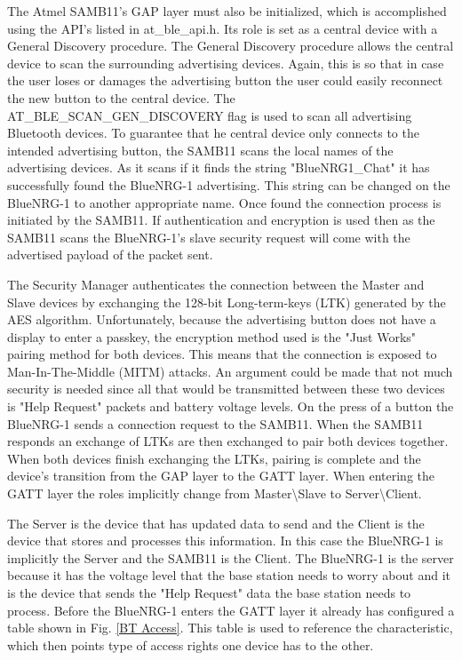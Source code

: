 \documentclass[journal,compsoc]{IEEEtran}
\begin{document}
The Atmel SAMB11’s GAP layer must also be initialized, which is accomplished using the API's listed in at\_ble\_api.h.  Its role is set as a central device with a General Discovery procedure. The General Discovery procedure allows the central device to scan the surrounding advertising devices. Again, this is so that in case the user loses or damages the advertising button the user could easily reconnect the new button to the central device. The AT\_BLE\_SCAN\_GEN\_DISCOVERY flag is used to scan all advertising Bluetooth devices. To guarantee that he central device only connects to the intended advertising button, the SAMB11 scans the local names of the advertising devices. As it scans if it finds the string "BlueNRG1\_Chat" it has successfully found the BlueNRG-1 advertising. This string can be changed on the BlueNRG-1 to another appropriate name. Once found the connection process is initiated by the SAMB11. If authentication and encryption is used then as the SAMB11 scans the BlueNRG-1's slave security request will come with the advertised payload of the packet sent.

The Security Manager authenticates the connection between the Master and Slave devices by exchanging the 128-bit Long-term-keys (LTK) generated by the AES algorithm. Unfortunately, because the advertising button does not have a display to enter a passkey, the encryption method used is the "Just Works" pairing method for both devices. This means that the connection is exposed to Man-In-The-Middle (MITM) attacks. An argument could be made that not much security is needed since all that would be transmitted between these two devices is "Help Request" packets and battery voltage levels. On the press of a button the BlueNRG-1 sends a connection request to the SAMB11. When the SAMB11 responds an exchange of LTKs are then exchanged to pair both devices together.  When both devices finish exchanging the LTKs, pairing is complete and the device's transition from the GAP layer to the GATT layer. When entering the GATT layer the roles implicitly change from Master\textbackslash Slave to Server\textbackslash Client.

The Server is the device that has updated data to send and the Client is the device that stores and processes this information. In this case the BlueNRG-1 is implicitly the Server and the SAMB11 is the Client. The BlueNRG-1 is the server because it has the voltage level that the base station needs to worry about and it is the device that sends the "Help Request" data the base station needs to process. Before the BlueNRG-1 enters the GATT layer it already has configured a table shown in Fig. \ref{BT Access}. This table is used to reference the characteristic, which then points  type of access rights one device has to the other.
\end{document}
